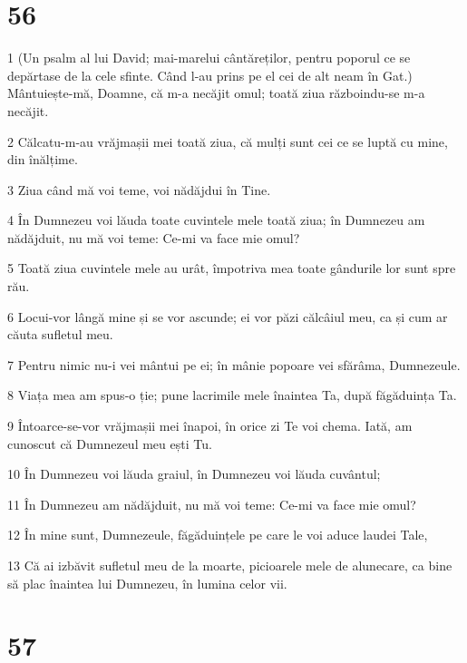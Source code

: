\chapter{56}

\par 1 (Un psalm al lui David; mai-marelui cântăreților, pentru poporul ce se depărtase de la cele sfinte. Când l-au prins pe el cei de alt neam în Gat.) Mântuiește-mă, Doamne, că m-a necăjit omul; toată ziua războindu-se m-a necăjit.
\par 2 Călcatu-m-au vrăjmașii mei toată ziua, că mulți sunt cei ce se luptă cu mine, din înălțime.
\par 3 Ziua când mă voi teme, voi nădăjdui în Tine.
\par 4 În Dumnezeu voi lăuda toate cuvintele mele toată ziua; în Dumnezeu am nădăjduit, nu mă voi teme: Ce-mi va face mie omul?
\par 5 Toată ziua cuvintele mele au urât, împotriva mea toate gândurile lor sunt spre rău.
\par 6 Locui-vor lângă mine și se vor ascunde; ei vor păzi călcâiul meu, ca și cum ar căuta sufletul meu.
\par 7 Pentru nimic nu-i vei mântui pe ei; în mânie popoare vei sfărâma, Dumnezeule.
\par 8 Viața mea am spus-o ție; pune lacrimile mele înaintea Ta, după făgăduința Ta.
\par 9 Întoarce-se-vor vrăjmașii mei înapoi, în orice zi Te voi chema. Iată, am cunoscut că Dumnezeul meu ești Tu.
\par 10 În Dumnezeu voi lăuda graiul, în Dumnezeu voi lăuda cuvântul;
\par 11 În Dumnezeu am nădăjduit, nu mă voi teme: Ce-mi va face mie omul?
\par 12 În mine sunt, Dumnezeule, făgăduințele pe care le voi aduce laudei Tale,
\par 13 Că ai izbăvit sufletul meu de la moarte, picioarele mele de alunecare, ca bine să plac înaintea lui Dumnezeu, în lumina celor vii.

\chapter{57}

